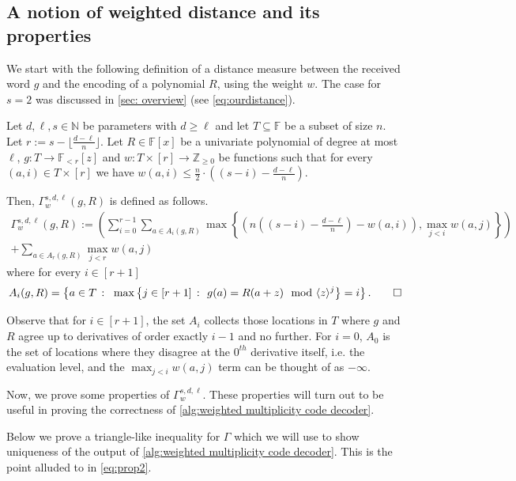\documentclass{theoretics}
\def\Integer{\mathbb{Z}}
\def\Natural{\mathbb{N}}
\def\Field{\mathbb{F}}
\let\N\Natural
\let\Z\Integer
\let\F\Field
\def\inbrace#1{\left\{ #1 \right\}}
\def\setdef#1#2{\inbrace{ #1 \ \colon \ #2}}      %
\begin{document}
	\subsection{A notion of weighted distance and its properties}\label{sec:weighted distance}
	We start with the following definition of a distance measure between the received word $g$ and the encoding of a polynomial $R$, using the weight $w$. The case for $s=2$ was discussed in \cref{sec: overview} (see \cref{eq:ourdistance}).
	\begin{definition} \label{def: gamma}
		Let $d, \ell, s \in \N$ be parameters with $d \geq \ell$ and let $T
		\subseteq \F$ be a subset of size $n$. 
		Let  $r:=s-\lfloor \frac{d-\ell}{n} \rfloor$. Let $R \in \F[x]$ be a
		univariate polynomial of degree at most $\ell$, $g\colon T \to
		\F_{<r}[z]$ and $w\colon  T \times [r] \to \Z_{\geq 0}$ be functions
		such that for every $(a, i) \in T \times [r]$ we have $w(a,i) \leq
		\frac{n}{2}\cdot \left((s-i) - \frac{d-\ell}{n}\right)$. 
		
		Then, $\Gamma_w^{s, d, \ell}(g, R)$ is defined as follows. 
		\begin{multline*}
		\Gamma_w^{s, d, \ell}(g, R) :=  \left(\sum_{i = 0}^{r-1}\sum_{a \in A_i(g,R)} \max \left\{\left(n\left((s-i) - \frac{d-\ell}{n}\right) - w(a,i)\right), \max_{j < i} w(a, j) \right\}\right)\\
        + \sum_{a\in A_r(g,R)} \max_{j < r} w(a, j)
		\end{multline*}
		where for every $i \in [r+1]$
		\[
		A_i(g,R)=\setdef{a\in T}{\max{\setdef{j\in [r+1]}{g(a)=R(a+z) \mod \langle z\rangle^{j}}}=i}. \qedhere
		\] 
		
	\end{definition}
	Observe that for $i\in [r+1]$, the set $A_i$ collects those locations in $T$ where $g$ and $R$ agree up to derivatives of order exactly $i-1$ and no further. For $i=0$, $A_0$ is the set of locations where they disagree at the $0^{th}$ derivative itself, i.e. the evaluation level, and the $\max_{j < i} w(a, j)$ term can be thought of as $- \infty$.
	
	Now, we prove some properties of $\Gamma_w^{s, d, \ell}$. These properties will turn out to be useful in proving the correctness of \cref{alg:weighted multiplicity code decoder}.
	
	
	
	Below we prove a triangle-like inequality for $\Gamma$ which we will use to show uniqueness of the output of \cref{alg:weighted multiplicity code decoder}. This is the point alluded to in \cref{eq:prop2}.
	
\end{document}
